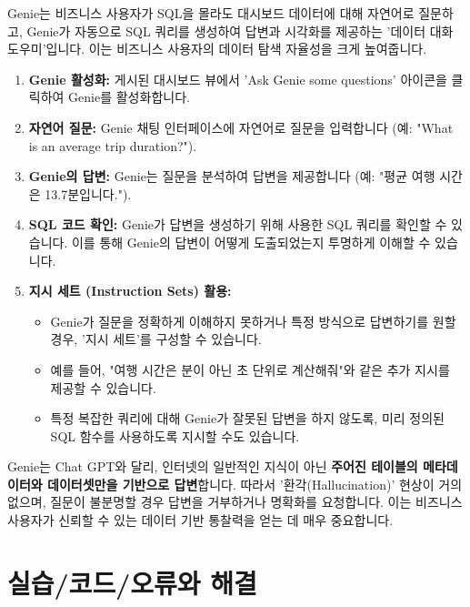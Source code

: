 \documentclass[11pt,a4paper]{article}
\theoremstyle{definition}
\begin{document}
\begin{summarybox}[title=핵심 요약: 자연어로 데이터와 대화하기]
Genie는 비즈니스 사용자가 SQL을 몰라도 대시보드 데이터에 대해 자연어로 질문하고, Genie가 자동으로 SQL 쿼리를 생성하여 답변과 시각화를 제공하는 '데이터 대화 도우미'입니다. 이는 비즈니스 사용자의 데이터 탐색 자율성을 크게 높여줍니다.
\end{summarybox}

\begin{enumerate}
    \item \textbf{Genie 활성화:} 게시된 대시보드 뷰에서 'Ask Genie some questions' 아이콘을 클릭하여 Genie를 활성화합니다.
    \item \textbf{자연어 질문:} Genie 채팅 인터페이스에 자연어로 질문을 입력합니다 (예: "What is an average trip duration?").
    \item \textbf{Genie의 답변:} Genie는 질문을 분석하여 답변을 제공합니다 (예: "평균 여행 시간은 13.7분입니다.").
    \item \textbf{SQL 코드 확인:} Genie가 답변을 생성하기 위해 사용한 SQL 쿼리를 확인할 수 있습니다. 이를 통해 Genie의 답변이 어떻게 도출되었는지 투명하게 이해할 수 있습니다.
    \item \textbf{지시 세트 (Instruction Sets) 활용:}
    \begin{itemize}
        \item Genie가 질문을 정확하게 이해하지 못하거나 특정 방식으로 답변하기를 원할 경우, '지시 세트'를 구성할 수 있습니다.
        \item 예를 들어, "여행 시간은 분이 아닌 초 단위로 계산해줘"와 같은 추가 지시를 제공할 수 있습니다.
        \item 특정 복잡한 쿼리에 대해 Genie가 잘못된 답변을 하지 않도록, 미리 정의된 SQL 함수를 사용하도록 지시할 수도 있습니다.
    \end{itemize}
\end{enumerate}

\begin{examplebox}[title=Genie의 강점]
Genie는 Chat GPT와 달리, 인터넷의 일반적인 지식이 아닌 \textbf{주어진 테이블의 메타데이터와 데이터셋만을 기반으로 답변}합니다. 따라서 '환각(Hallucination)' 현상이 거의 없으며, 질문이 불분명할 경우 답변을 거부하거나 명확화를 요청합니다. 이는 비즈니스 사용자가 신뢰할 수 있는 데이터 기반 통찰력을 얻는 데 매우 중요합니다.
\end{examplebox}

\newpage
\section{실습/코드/오류와 해결}
\end{document}
